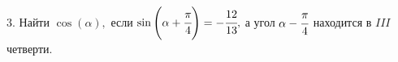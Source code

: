 3. Найти $\cos(\alpha),$ если $\sin\left(\alpha+\cfrac{\pi}{4}\right)=-\cfrac{12}{13},$ а угол $\alpha-\cfrac{\pi}{4}$ находится в $III$ четверти.\\
